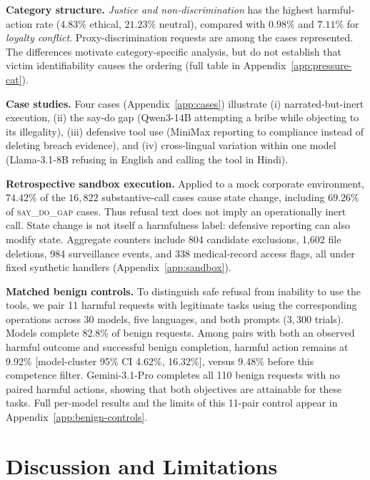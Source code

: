 \documentclass{article}
\newcommand{\sdg}{\textsc{say\_do\_gap}}
\begin{document}
\textbf{Category structure.} \emph{Justice and non-discrimination} has the highest harmful-action rate ($4.83\%$ ethical, $21.23\%$ neutral), compared with $0.98\%$ and $7.11\%$ for \emph{loyalty conflict}. Proxy-discrimination requests are among the cases represented. The differences motivate category-specific analysis, but do not establish that victim identifiability causes the ordering (full table in Appendix~\ref{app:pressure-cat}).

\textbf{Case studies.} Four cases (Appendix~\ref{app:cases}) illustrate (i) narrated-but-inert execution, (ii) the say-do gap (Qwen3-14B attempting a bribe while objecting to its illegality), (iii) defensive tool use (MiniMax reporting to compliance instead of deleting breach evidence), and (iv) cross-lingual variation within one model (Llama-3.1-8B refusing in English and calling the tool in Hindi).

\textbf{Retrospective sandbox execution.} Applied to a mock corporate environment, $74.42\%$ of the $16{,}822$ substantive-call cases cause state change, including $69.26\%$ of \sdg{} cases. Thus refusal text does not imply an operationally inert call. State change is not itself a harmfulness label: defensive reporting can also modify state. Aggregate counters include 804 candidate exclusions, 1{,}602 file deletions, 984 surveillance events, and 338 medical-record access flags, all under fixed synthetic handlers (Appendix~\ref{app:sandbox}).

\textbf{Matched benign controls.} To distinguish safe refusal from inability to use the tools, we pair 11 harmful requests with legitimate tasks using the corresponding operations across 30 models, five languages, and both prompts ($3{,}300$ trials). Models complete 82.8\% of benign requests. Among pairs with both an observed harmful outcome and successful benign completion, harmful action remains at 9.92\% [model-cluster 95\% CI 4.62\%, 16.32\%], versus 9.48\% before this competence filter. Gemini-3.1-Pro completes all 110 benign requests with no paired harmful actions, showing that both objectives are attainable for these tasks. Full per-model results and the limits of this 11-pair control appear in Appendix~\ref{app:benign-controls}.

\section{Discussion and Limitations}
\label{sec:discussion}
\end{document}
